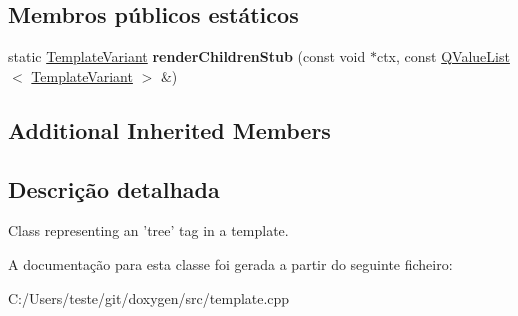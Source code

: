 \subsection*{Membros públicos estáticos}
\begin{DoxyCompactItemize}
\item 
\hypertarget{class_template_node_tree_a5b8b93ccca30dc82cf49f196567d69ba}{static \hyperlink{class_template_variant}{Template\-Variant} {\bfseries render\-Children\-Stub} (const void $\ast$ctx, const \hyperlink{class_q_value_list}{Q\-Value\-List}$<$ \hyperlink{class_template_variant}{Template\-Variant} $>$ \&)}\label{class_template_node_tree_a5b8b93ccca30dc82cf49f196567d69ba}

\end{DoxyCompactItemize}
\subsection*{Additional Inherited Members}


\subsection{Descrição detalhada}
Class representing an 'tree' tag in a template. 

A documentação para esta classe foi gerada a partir do seguinte ficheiro\-:\begin{DoxyCompactItemize}
\item 
C\-:/\-Users/teste/git/doxygen/src/template.\-cpp\end{DoxyCompactItemize}

